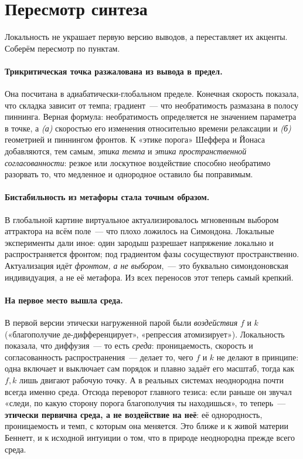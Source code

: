\documentclass[11pt]{article}
\begin{document}
\section{Пересмотр синтеза}
Локальность не украшает первую версию выводов, а переставляет их акценты. Соберём пересмотр по пунктам.

\paragraph{Трикритическая точка разжалована из вывода в предел.} Она посчитана в адиабатически-глобальном
пределе. Конечная скорость показала, что складка зависит от темпа; градиент~— что необратимость размазана в
полосу пиннинга. Верная формула: необратимость определяется не значением параметра в точке, а \emph{(а)}
скоростью его изменения относительно времени релаксации и \emph{(б)} геометрией и пиннингом фронтов. К «этике
порога» Шеффера и Йонаса добавляются, тем самым, \emph{этика темпа} и \emph{этика пространственной
согласованности}: резкое или лоскутное воздействие способно необратимо разорвать то, что медленное и однородное
оставило бы поправимым.

\paragraph{Бистабильность из метафоры стала точным образом.} В глобальной картине виртуальное актуализировалось
мгновенным выбором аттрактора на всём поле~— что плохо ложилось на Симондона. Локальные эксперименты дали иное:
один зародыш разрешает напряжение локально и распространяется фронтом; под градиентом фазы сосуществуют
пространственно. Актуализация идёт \emph{фронтом, а не выбором},~— это буквально симондоновская индивидуация,
а не её метафора. Из всех переносов этот теперь самый крепкий.

\paragraph{На первое место вышла среда.} В первой версии этически нагруженной парой были \emph{воздействия} $f$
и $k$ («благополучие де-дифференцирует», «репрессия атомизирует»). Локальность показала, что диффузия~— то есть
\emph{среда}: проницаемость, скорость и согласованность распространения~— делает то, чего $f$ и $k$ не делают в
принципе: одна включает и выключает сам порядок и плавно задаёт его масштаб, тогда как $f,k$ лишь двигают рабочую
точку. А в реальных системах неоднородна почти всегда именно среда. Отсюда переворот главного тезиса: если
раньше он звучал «следи, по какую сторону порога благополучия ты находишься», то теперь~— \textbf{этически
первична среда, а не воздействие на неё}: её однородность, проницаемость и темп, с которым она меняется. Это
ближе и к живой материи Беннетт, и к исходной интуиции о том, что в природе неоднородна прежде всего среда.
\end{document}
